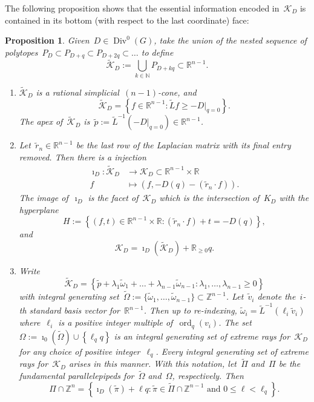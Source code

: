 \documentclass{amsart}
\newtheorem{prop}[thm]{Proposition}
\DeclareMathOperator{\Div}{Div}
\DeclareMathOperator{\ord}{ord}
\newcommand{\Z}{\mathbb{Z}}
\newcommand{\R}{\mathbb{R}}
\newcommand{\N}{\mathbb{N}}
\newcommand{\tL}{\tilde{L}}
\newcommand{\tl}{\ell}
\newcommand{\K}{\mathcal{K}}
\newcommand{\tK}{\widetilde{\mathcal{K}}}
\begin{document}
The following proposition shows that the essential information encoded
in~$\K_{D}$ is contained in its bottom (with respect to the last
coordinate) face:
\begin{prop}\label{prop: facet}  Given~$D\in\Div^0(G)$, take the union of the
  nested sequence of
  polytopes~$P_D\subset P_{D+q}\subset P_{D+2q}\subset\dots$ to define
  \[
    \tK_D:=\bigcup_{k\in\N} P_{D+kq}\subset\R^{n-1}.
  \]
  \begin{enumerate}[label=\rm{(\arabic*)},leftmargin=*]
    \item\label{facet1} $\tK_D$ is a rational simplicial~$(n-1)$-cone, and
      \[
	\tK_D=\left\{ f\in\R^{n-1}:\tL f\geq-D|_{q=0} \right\}.
      \]
      The apex of~$\tK_D$ is~$\tilde{p}:=\tL^{-1}(-D|_{q=0})\in\R^{n-1}$.
    \item\label{facet2} Let~$\tilde{r}_n\in\R^{n-1}$ be the last row of the Laplacian
      matrix with its final entry removed.  Then there is a
      injection
      \begin{align*}
	\imath_D\colon\tK_D&\to\K_D\subset\R^{n-1}\times\R\\
	f&\mapsto (f,-D(q)-(\tilde{r}_n\cdot f)).
      \end{align*}
      The image of~$\imath_D$ is the facet of~$\K_D$ which is the intersection
      of~$K_D$ with the hyperplane 
      \[
	H:=\left\{(f,t)\in\R^{n-1}\times\R: (\tilde{r}_n\cdot f)+t=-D(q)  \right\},
      \]
      and
      \[
	\K_D=\imath_D(\tK_D)+\R_{\geq0}q.
      \]
    \item\label{facet3} Write
      \[
	\tK_D=\left\{\tilde{p}+\lambda_1\tilde{\omega}_1
	  +\dots+\lambda_{n-1}\tilde{\omega}_{n-1}:
	  \lambda_1,\dots,\lambda_{n-1}\geq0
	\right\}
      \]
      with integral generating
      set~$\tilde{\Omega}:=\{\tilde{\omega}_1,\dots,\tilde{\omega}_{n-1}\}\subset\Z^{n-1}$.
      Let~$\tilde{v}_i$ denote the~$i$-th standard basis vector for~$\R^{n-1}$.
      Then up to re-indexing, $\tilde{\omega}_i=\tL^{-1}(\tl_{i}\tilde{v}_i)$
      where~$\tl_{i}$ is a positive integer multiple of~$\ord_q(v_i)$.  The set
      $\Omega:=\imath_0(\tilde{\Omega})\cup\left\{ \tl_qq \right\}$ is an
      integral generating set of extreme rays for~$\K_D$ for any choice of
      positive integer~$\tl_q$.  Every integral generating set of extreme rays
      for~$\K_D$ arises in this manner.  With this notation,
      let~$\widetilde{\Pi}$ and~$\Pi$ be the fundamental parallelepipeds
      for~$\tilde{\Omega}$ and~$\Omega$, respectively.  Then
      \[
	\Pi\cap\Z^n=\left\{ \imath_D(\tilde{\pi})+\ell q:
	\tilde{\pi}\in\widetilde{\Pi}\cap\Z^{n-1}\text{ and } 0\leq \ell<\tl_q\right\}.
      \]
  \end{enumerate}
\end{prop}
\end{document}
